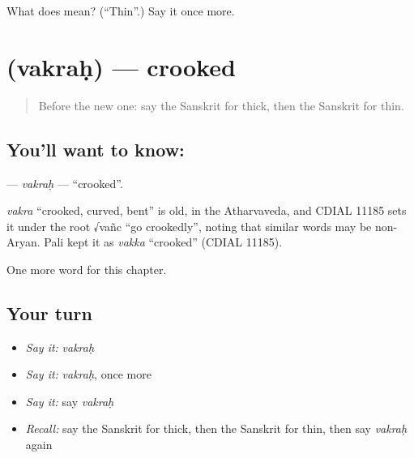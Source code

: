 \begin{tcolorbox}[breakable,colback=teal!4,colframe=teal!35!black,title={Before you move on}]
What does  mean? (\textquotedblleft{}Thin\textquotedblright{}.) Say it once more.
\end{tcolorbox}
\section[\texorpdfstring{\sk{वक्रः} (vakraḥ)}{वक्रः (vakraḥ)}]{ (vakraḥ) — crooked}

\label{lesson:SA-C132-vakrah}



\begin{quote}
Before the new one: say the Sanskrit for thick, then the Sanskrit for thin.
\end{quote}

\subsection*{You'll want to know: }
\textbf{} — \emph{vakraḥ} — \textquotedblleft{}crooked\textquotedblright{}.

\begin{cousinweb}
\emph{vakra} \textquotedblleft{}crooked, curved, bent\textquotedblright{} is old, in the Atharvaveda, and CDIAL 11185 sets it under the root √vañc \textquotedblleft{}go crookedly\textquotedblright{}, noting that similar words may be non-Aryan. Pali kept it as \emph{vakka} \textquotedblleft{}crooked\textquotedblright{} (CDIAL 11185).
\end{cousinweb}

\begin{grammarlens}[title={What you've built}]
One more word for this chapter.
\end{grammarlens}

\subsection*{Your turn}
\begin{itemize}
\raggedright
  \item \emph{Say it:} \emph{vakraḥ}
  \item \emph{Say it:} \emph{vakraḥ}, once more
  \item \emph{Say it:} say \emph{vakraḥ}
  \item \emph{Recall:} say the Sanskrit for thick, then the Sanskrit for thin, then say \emph{vakraḥ} again
\end{itemize}

